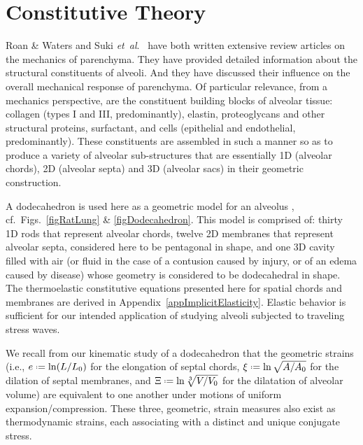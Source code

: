 \part{Constitutive Theory}
\label{partConstitutive}

Roan \& Waters \cite{RoanWaters11} and Suki \textit{et~al}.\ \cite{Sukietal05,Sukietal11} have both written extensive review articles on the mechanics of parenchyma.  They have provided detailed information about the structural constituents of alveoli.  And they have discussed their influence on the overall mechanical response of parenchyma.  Of particular relevance, from a mechanics perspective, are the constituent building blocks of alveolar tissue: collagen (types I and III, predominantly), elastin, proteoglycans and other structural proteins, surfactant, and cells (epithelial and endothelial, predominantly).  These constituents are assembled in such a manner so as to produce a variety of alveolar sub-structures that are essentially 1D (alveolar chords), 2D (alveolar septa) and 3D (alveolar sacs) in their geometric construction.

A dodecahedron is used here as a geometric model for an alveolus \cite{FrankusLee74}, cf.\ Figs.~\ref{figRatLung} \& \ref{figDodecahedron}.  This model is comprised of: thirty 1D rods that represent alveolar chords, twelve 2D membranes that represent alveolar septa, considered here to be pentagonal in shape, and one 3D cavity filled with air (or fluid in the case of a contusion caused by injury, or of an edema caused by disease) whose geometry is considered to be dodecahedral in shape.  The thermo\-elastic constitutive equations presented here for spatial chords and membranes are derived in Appendix~\ref{appImplicitElasticity}.  Elastic behavior is sufficient for our intended application of studying alveoli subjected to traveling stress waves.

We recall from our kinematic study of a dodecahedron that the geometric strains (i.e., $e \defeq \ln ( L / L_0 )$ for the elongation of septal chords, $\xi \defeq \ln \sqrt{A / A_0}$ for the dilation of septal membranes, and $\Xi \defeq \ln \sqrt[3]{V / V_0}$ for the dilatation of alveolar volume) are equivalent to one another under motions of uniform expansion\slash compression.  These three, geometric, strain measures also exist as thermo\-dynamic strains, each associating with a distinct and unique conjugate stress. \cite{Freed17,FreedZamani19}

